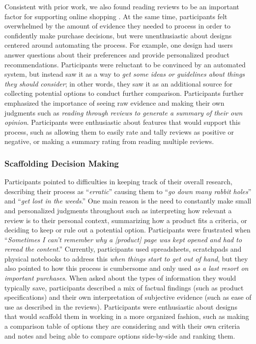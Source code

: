 Consistent with prior work, we also found reading reviews to be an important factor for supporting online shopping  \cite{gan2012helpfulness,mudambi2010research}. At the same time, participants felt overwhelmed by the amount of evidence they needed to process in order to confidently make purchase decisions, but were unenthusiastic about designs centered around automating the process. For example, one design had users answer questions about their preferences and provide personalized product recommendations. Participants were reluctant to be convinced by an automated system, but instead saw it as a way to \emph{get some ideas or guidelines about things they should consider}; in other words, they saw it as an additional source for collecting potential options to conduct further comparison. Participants further emphasized the importance of seeing raw evidence and making their own judgments such as \emph{reading through reviews to generate a summary of their own opinion}. Participants were enthusiastic about features that would support this process, such as allowing them to easily rate and tally reviews as positive or negative, or making a summary rating from reading multiple reviews.

\subsubsection{Scaffolding Decision Making}

Participants pointed to difficulties in keeping track of their overall research, describing their process as ``\emph{erratic}'' causing them to ``\emph{go down many rabbit holes}'' and ``\emph{get lost in the weeds}.'' One main reason is the need to constantly make small and personalized judgments throughout such as interpreting how relevant a review is to their personal context, summarizing how a product fits a criteria, or deciding to keep or rule out a potential option. Participants were frustrated when ``\emph{Sometimes I can’t remember why a [product] page was kept opened and had to reread the content}.'' Currently, participants used spreadsheets, scratchpads and physical notebooks to address this \emph{when things start to get out of hand}, but they also pointed to how this process is cumbersome and only used \emph{as a last resort on important purchases}. When asked about the types of information they would typically save, participants described a mix of factual findings (such as product specifications) and their own interpretation of subjective evidence (such as ease of use as described in the reviews). Participants were enthusiastic about designs that would scaffold them in working in a more organized fashion, such as making a comparison table of options they are considering and with their own criteria and notes and being able to compare options side-by-side and ranking them.


